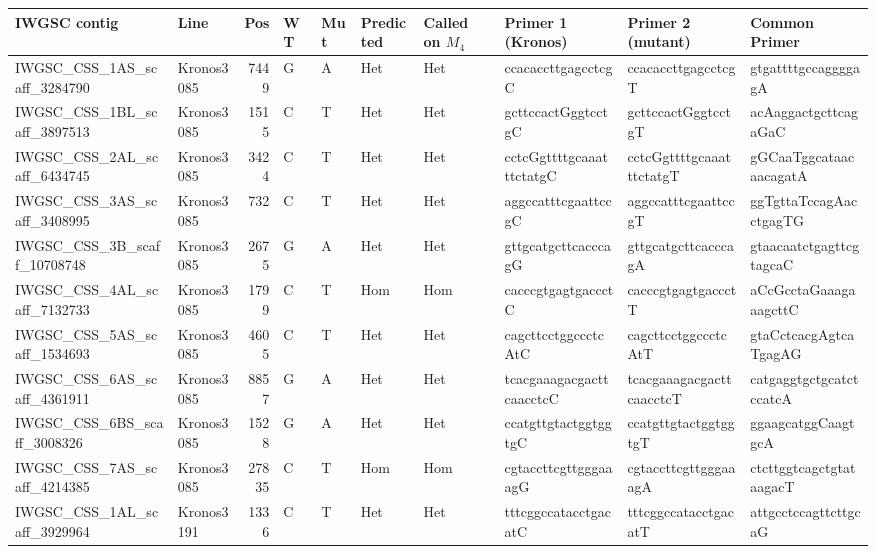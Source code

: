 
\begin{tabular}{llrlllllll}
\toprule
 IWGSC contig                 & Line       &   Pos & WT   & Mut   & Predicted   & Called on $M_{4}$    & Primer 1 (Kronos)        & Primer 2 (mutant)        & Common Primer            \\
\midrule
 IWGSC\_CSS\_1AS\_scaff\_3284790  & Kronos3085 &  7449 & G    & A     & Het    & Het   & ccacaccttgagcctcgC       & ccacaccttgagcctcgT       & gtgattttgccaggggagA      \\
 IWGSC\_CSS\_1BL\_scaff\_3897513  & Kronos3085 &  1515 & C    & T     & Het    & Het   & gcttccactGggtcctgC       & gcttccactGggtcctgT       & acAaggactgcttcagaGaC     \\
 IWGSC\_CSS\_2AL\_scaff\_6434745  & Kronos3085 &  3424 & C    & T     & Het    & Het   & cctcGgttttgcaaatttctatgC & cctcGgttttgcaaatttctatgT & gGCaaTggcataacaacagatA   \\
 IWGSC\_CSS\_3AS\_scaff\_3408995  & Kronos3085 &   732 & C    & T     & Het    & Het   & aggccatttcgaattccgC      & aggccatttcgaattccgT      & ggTgttaTccagAacctgagTG   \\
 IWGSC\_CSS\_3B\_scaff\_10708748  & Kronos3085 &  2675 & G    & A     & Het    & Het   & gttgcatgcttcacccagG      & gttgcatgcttcacccagA      & gtaacaatctgagttcgtagcaC  \\
 IWGSC\_CSS\_4AL\_scaff\_7132733  & Kronos3085 &  1799 & C    & T     & Hom    & Hom   & cacccgtgagtgaccctC       & cacccgtgagtgaccctT       & aCcGcctaGaaagaaagcttC    \\
 IWGSC\_CSS\_5AS\_scaff\_1534693  & Kronos3085 &  4605 & C    & T     & Het    & Het   & cagcttcctggccctcAtC      & cagcttcctggccctcAtT      & gtaCctcacgAgtcaTgagAG    \\
 IWGSC\_CSS\_6AS\_scaff\_4361911  & Kronos3085 &  8857 & G    & A     & Het    & Het   & tcacgaaagacgacttcaacctcC & tcacgaaagacgacttcaacctcT & catgaggtgctgcatctccatcA  \\
 IWGSC\_CSS\_6BS\_scaff\_3008326  & Kronos3085 &  1528 & G    & A     & Het    & Het   & ccatgttgtactggtggtgC     & ccatgttgtactggtggtgT     & ggaagcatggCaagtgcA       \\
 IWGSC\_CSS\_7AS\_scaff\_4214385  & Kronos3085 & 27835 & C    & T     & Hom    & Hom   & cgtaccttcgttgggaaagG     & cgtaccttcgttgggaaagA     & ctcttggtcagctgtataagacT  \\
 IWGSC\_CSS\_1AL\_scaff\_3929964  & Kronos3191 &  1336 & C    & T     & Het    & Het   & tttcggccatacctgacatC     & tttcggccatacctgacatT     & attgcctccagttcttgcaG     \\

\end{tabular}
